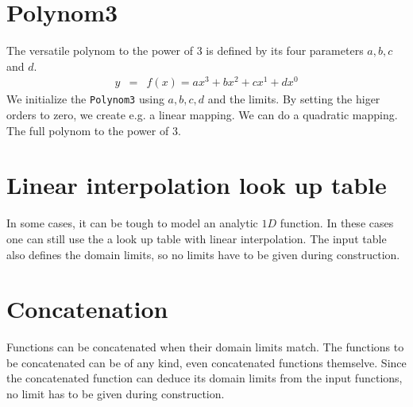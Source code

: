 \section{Polynom3}
%
The versatile polynom to the power of 3 is defined by its four parameters $a,b,c$ and $d$.
%
\begin{eqnarray}
    y &=& f(x) = ax^3 + bx^2 + cx^1 + dx^0
\end{eqnarray}
%
We initialize the \lstinline{Polynom3} using $a,b,c,d$ and the limits. 
%
By setting the higer orders to zero, we create e.g. a linear mapping.
%
%
We can do a quadratic mapping.
%
The full polynom to the power of $3$.
%
%
\section{Linear interpolation look up table}
%
In some cases, it can be tough to model an analytic $1D$ function. In these cases one can still use the a look up table with linear interpolation.
%
The input table also defines the domain limits, so no limits have to be given during construction.
%
\section{Concatenation}
%
Functions can be concatenated when their domain limits match.
%
The functions to be concatenated can be of any kind, even concatenated functions themselve.
%
Since the concatenated function can deduce its domain limits from the input functions, no limit has to be given during construction.
%
